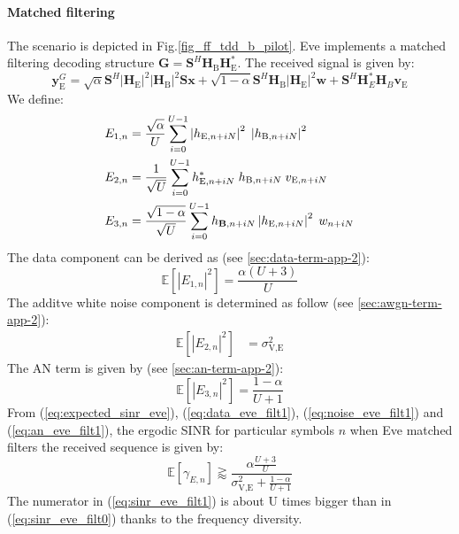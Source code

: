 \documentclass[journal,comsoc]{IEEEtran}
\newcommand{\module}[1]{\left|#1\right|}
\newcommand{\EX}[1]{\mathbb{E} \left[#1\right]}%
\newcommand{\HE}{\textbf{H}_{\text{E}}}
\newcommand{\HB}{\textbf{H}_{\text{B}}}
\newcommand{\ve}{\textbf{v}_{\text{E}}}
\newcommand{\spread}{\textbf{S}}
\newcommand{\w}{\textbf{w}}
\begin{document}
\paragraph{Matched filtering}
The scenario is depicted in Fig.\ref{fig_ff_tdd_b_pilot}. Eve implements a matched filtering decoding structure $\textbf{G} = \spread^H \HB\HE^*$. The received signal is given by:
\begin{equation}
\textbf{y}_{\text{E}}^G = \sqrt{\alpha} \spread^H \module{\HE}^2 \module{\HB}^2 \spread\textbf{x} +  \sqrt{1-\alpha} \spread^H \HB\module{\HE}^2 \w  +  \spread^H  \textbf{H}^*_E \textbf{H}_B \ve
\label{eq:rx_eve_filt1}
\end{equation}
We define: 
\begin{equation}
\begin{split}
E_{1,n} &= \frac{\sqrt{\alpha}}{U}\sum_{i=0}^{U-1}  \left|h_{\text{E}, n + iN}\right|^2 \; \left|h_{\text{B}, n + iN}\right|^2 \\
E_{2,n} &= \frac{1}{\sqrt{U}}\sum_{i=0}^{U-1} h^*_{\text{E}, n + iN} \; h_{\text{B}, n + iN} \; v_{\text{E}, n + iN}\\
E_{3,n} &=\frac{ \sqrt{1-\alpha}  }{\sqrt{U}}\sum_{i=0}^{U-1}    h_{\text{\textbf{B}}, n + iN} \left|h_{\text{E}, n + iN}\right|^2\; w_{n + iN}
\end{split}
\end{equation}
The data component can be derived as (see \ref{sec:data-term-app-2}):
\begin{equation}
\EX{|E_{1,n}|^2} =  \frac{\alpha (U+3)}{U}
\label{eq:data_eve_filt1}
\end{equation}
The additve white noise component is determined as follow  (see \ref{sec:awgn-term-app-2}):
\begin{equation}
	\begin{split}
	\EX{|E_{2,n}|^2} &= \sigma^2_{\text{V,E}}
	\end{split}
	\label{eq:noise_eve_filt1}
\end{equation}
The AN term is given by (see \ref{sec:an-term-app-2}):
\begin{equation}
	\EX{|E_{3,n}|^2} = \frac{1-\alpha}{U+1}
	\label{eq:an_eve_filt1}
\end{equation}
From (\ref{eq:expected_sinr_eve}), (\ref{eq:data_eve_filt1}), (\ref{eq:noise_eve_filt1}) and (\ref{eq:an_eve_filt1}),  the ergodic SINR for particular symbols $n$ when Eve matched filters the received sequence is given by:
\begin{equation}
\EX{\gamma_{E,n}} \gtrapprox \frac{\alpha \frac{U+3}{U}}{\sigma^2_{\text{V,E}} + \frac{1-\alpha}{U+1}}
\label{eq:sinr_eve_filt1}
\end{equation}
The numerator in (\ref{eq:sinr_eve_filt1}) is about U times bigger than in (\ref{eq:sinr_eve_filt0}) thanks to the frequency diversity.
\end{document}
